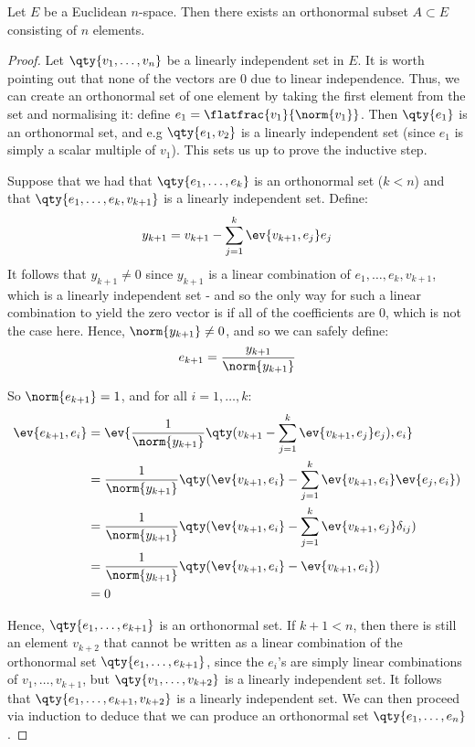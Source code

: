 \begin{proposition}
  Let \( E \) be a Euclidean \( n \)-space. Then there exists an orthonormal subset \( A\subset E \) consisting of \( n \) elements.
\end{proposition}
\begin{proof}
  Let \( \qty{v_1,\dots,v_n} \) be a linearly independent set in \( E \). It is worth pointing out that none of the vectors are 0 due to linear independence. Thus, we can create an orthonormal set of one element by taking the first element from the set and normalising it: define \( e_1=\flatfrac{v_1}{\norm{v_1}} \). Then \( \qty{e_1} \) is an orthonormal set, and e.g \( \qty{e_1,v_2} \) is a linearly independent set (since \( e_1 \) is simply a scalar multiple of \( v_1 \)). This sets us up to prove the inductive step.

  \vspace{3mm}

  Suppose that we had that \( \qty{e_1,\dots,e_k} \) is an orthonormal set (\( k<n \)) and that \( \qty{e_1,\dots,e_k,v_{k+1}} \) is a linearly independent set. Define:
  \[ y_{k+1}=v_{k+1}-\sum_{j=1}^k\ev{v_{k+1},e_j}e_j \]
  It follows that \( y_{k+1}\neq 0 \) since \( y_{k+1} \) is a linear combination of \( e_1,\dots,e_k,v_{k+1} \), which is a linearly independent set - and so the only way for such a linear combination to yield the zero vector is if all of the coefficients are 0, which is not the case here. Hence, \( \norm{y_{k+1}}\neq 0 \), and so we can safely define:
  \[ e_{k+1}=\frac{y_{k+1}}{\norm{y_{k+1}}} \]

  So \( \norm{e_{k+1}}=1 \), and for all \( i=1,\dots,k \):
  \begin{align*}
    \ev{e_{k+1},e_i}&=\ev{\frac{1}{\norm{y_{k+1}}}\qty(v_{k+1}-\sum_{j=1}^k\ev{v_{k+1},e_j}e_j),e_i}\\
    &= \frac{1}{\norm{y_{k+1}}}\qty(\ev{v_{k+1},e_i}-\sum_{j=1}^k\ev{v_{k+1},e_i}\ev{e_j,e_i})\\
    &= \frac{1}{\norm{y_{k+1}}}\qty(\ev{v_{k+1},e_i}-\sum_{j=1}^k\ev{v_{k+1},e_j}\delta_{ij})\\
    &= \frac{1}{\norm{y_{k+1}}}\qty(\ev{v_{k+1},e_i}-\ev{v_{k+1},e_i})\\
    &= 0
  \end{align*}

  Hence, \( \qty{e_1,\dots,e_{k+1}} \) is an orthonormal set. If \( k+1<n \), then there is still an element \( v_{k+2} \) that cannot be written as a linear combination of the orthonormal set \( \qty{e_1,\dots,e_{k+1}} \), since the \( e_i \)'s are simply linear combinations of \( v_1,\dots,v_{k+1} \), but \( \qty{v_1,\dots,v_{k+2}} \) is a linearly independent set. It follows that \( \qty{e_1,\dots,e_{k+1},v_{k+2}} \) is a linearly independent set. We can then proceed via induction to deduce that we can produce an orthonormal set \( \qty{e_1,\dots, e_n} \).
\end{proof}

